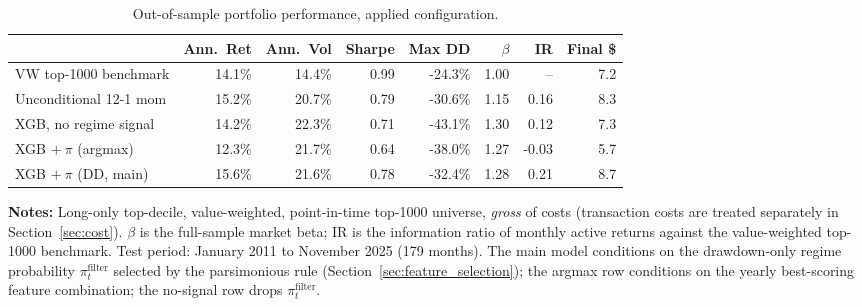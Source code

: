 \begin{table}[htbp]
\centering
\small
\begin{tabular}{l r r r r r r r}
\toprule
 & Ann.\ Ret & Ann.\ Vol & Sharpe & Max DD & $\beta$ & IR & Final \$ \\
\midrule
VW top-1000 benchmark & 14.1\% & 14.4\% & 0.99 & -24.3\% & 1.00 & -- & 7.2 \\
\midrule
Unconditional 12-1 mom & 15.2\% & 20.7\% & 0.79 & -30.6\% & 1.15 & 0.16 & 8.3 \\
XGB, no regime signal & 14.2\% & 22.3\% & 0.71 & -43.1\% & 1.30 & 0.12 & 7.3 \\
XGB $+\ \pi$ (argmax) & 12.3\% & 21.7\% & 0.64 & -38.0\% & 1.27 & -0.03 & 5.7 \\
XGB $+\ \pi$ (DD, main) & 15.6\% & 21.6\% & 0.78 & -32.4\% & 1.28 & 0.21 & 8.7 \\
\bottomrule
\end{tabular}
\caption{Out-of-sample portfolio performance, applied configuration.}
\label{tab:performance}

\medskip
\small
\textbf{Notes:} Long-only top-decile, value-weighted, point-in-time top-1000 universe, \emph{gross} of costs (transaction costs are treated separately in Section~\ref{sec:cost}). $\beta$ is the full-sample market beta; IR is the information ratio of monthly active returns against the value-weighted top-1000 benchmark. Test period: January 2011 to November 2025 (179 months). The main model conditions on the drawdown-only regime probability $\pi_t^{\text{filter}}$ selected by the parsimonious rule (Section~\ref{sec:feature_selection}); the argmax row conditions on the yearly best-scoring feature combination; the no-signal row drops $\pi_t^{\text{filter}}$.
\end{table}
